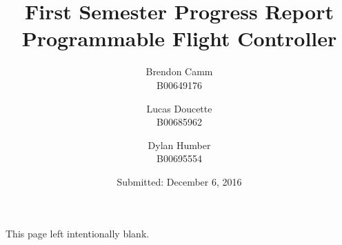 \documentclass[12pt, twoside, letterpaper,titlepage]{article}
\title{First Semester Progress Report \\ Programmable Flight Controller}
\author{Brendon Camm \\ B00649176 \and Lucas Doucette \\ B00685962 \and Dylan Humber \\ B00695554}
\date{Submitted: December 6, 2016}
\begin{document}
	\maketitle
	\newpage
	\begin{center}
		This page left intentionally blank.
	\end{center}

	\newpage
	\begin{abstract} %
	\end{abstract}
	\setcounter{tocdepth}{2}
	\tableofcontents
	\pagebreak
	
	
	
	
	
	
	
	
	
	
	\appendix
	
	
	
	
\end{document}
